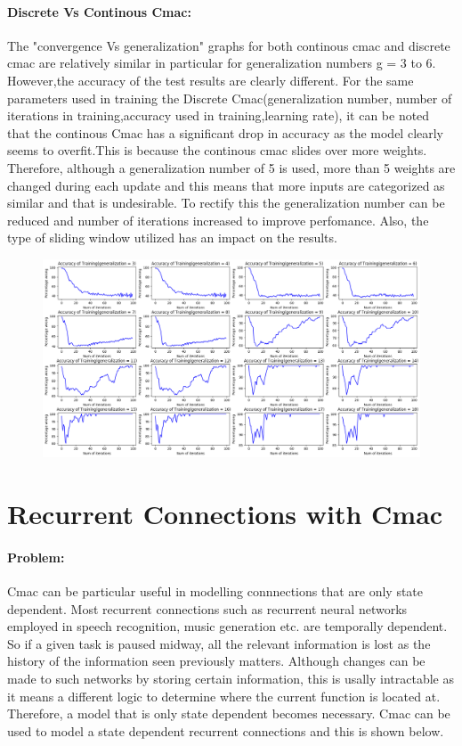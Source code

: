 \documentclass{article}
\begin{document}
  \paragraph{Discrete Vs Continous Cmac:}
  The "convergence Vs generalization" graphs for both continous cmac and discrete cmac are relatively similar in particular for generalization numbers g = 3 to 6. However,the accuracy of the test results  are clearly different.
  For the same parameters used in training the Discrete Cmac(generalization number, number of iterations in training,accuracy used in training,learning rate), it can be noted that the continous Cmac has a significant drop in accuracy as the model clearly seems to overfit.This is because the continous cmac slides over more weights. Therefore, although a generalization number of 5 is used, more than 5 weights are changed during each update and this means that more inputs are categorized as similar and that is undesirable. To rectify this the generalization number can be reduced and number of iterations increased to improve perfomance. Also, the type of sliding window utilized has an impact on the results.  
  \begin{figure}[h!]
    \centering
    \includegraphics[scale=0.35]{./Results/convergenceVsgeneralizationC.png}
  \end{figure}
\newpage
\section{Recurrent Connections with Cmac}
\paragraph{Problem:}
Cmac can be particular useful in modelling connnections that are only state dependent. Most recurrent connections such as
recurrent neural networks employed in speech recognition, music generation etc. are temporally dependent. So if a given task
is paused midway, all the relevant information is lost as the history of the information seen previously matters.
Although changes can be made to such networks by storing certain information, this is usally intractable as it means a different logic to determine where the current function is located at. 
Therefore, a model that is only state dependent becomes necessary. Cmac can be used to model a state dependent recurrent connections and this is shown below. 
\end{document}
